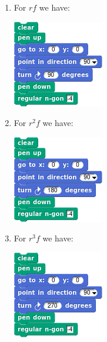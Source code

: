 \documentclass[noauthor,nooutcomes,12pt,hints]{ximera}
\begin{document}
\begin{question}
\begin{freeResponse}
\begin{enumerate}
\begin{center}
      \end{center}
    \item For $rf$ we have:
      \begin{center}
        \includegraphics[width=.3\textwidth]{rfSqSCRIPT.png}   \qquad {}
      \end{center}
    \item For $r^2f$ we have:
      \begin{center}
        \includegraphics[width=.3\textwidth]{r2fSqSCRIPT.png}   \qquad {}
      \end{center}
    \item For $r^3f$ we have:
      \begin{center}
        \includegraphics[width=.3\textwidth]{r3fSqSCRIPT.png}   \qquad {}

\end{center}
\end{enumerate}
\end{freeResponse}
\end{question}
\end{document}

